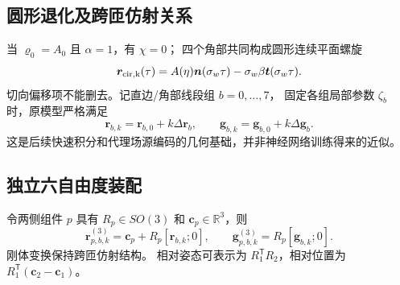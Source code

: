 \subsection{圆形退化及跨匝仿射关系}
当 \(\varrho_0=A_0\) 且 \(\alpha=1\)，有 \(\chi=0\)；
四个角部共同构成圆形连续平面螺旋
\[
\bm r_{\rm cir,k}(\tau)
=A(\eta)\bm n(\sigma_w\tau)-\sigma_w\beta\bm t(\sigma_w\tau).
\]
切向偏移项不能删去。记直边/角部线段组 \(b=0,\dots,7\)，
固定各组局部参数 \(\zeta_b\) 时，原模型严格满足
\begin{equation}
\boxed{
\bm r_{b,k}=\bm r_{b,0}+k\Delta\bm r_b,\qquad
\bm g_{b,k}=\bm g_{b,0}+k\Delta\bm g_b.
}
\label{eq:bfzi-affine}
\end{equation}
这是后续快速积分和代理场源编码的几何基础，并非神经网络训练得来的近似。

\subsection{独立六自由度装配}
令两侧组件 \(p\) 具有 \(R_p\in SO(3)\) 和
\(\bm c_p\in\mathbb R^3\)，则
\begin{equation}
\bm r_{p,b,k}^{(3)}
 =\bm c_p+R_p[\bm r_{b,k};0],\qquad
\bm g_{p,b,k}^{(3)}=R_p[\bm g_{b,k};0].
\end{equation}
刚体变换保持跨匝仿射结构。
相对姿态可表示为 \(R_1^{\mathsf T}R_2\)，相对位置为
\(R_1^{\mathsf T}(\bm c_2-\bm c_1)\)。
